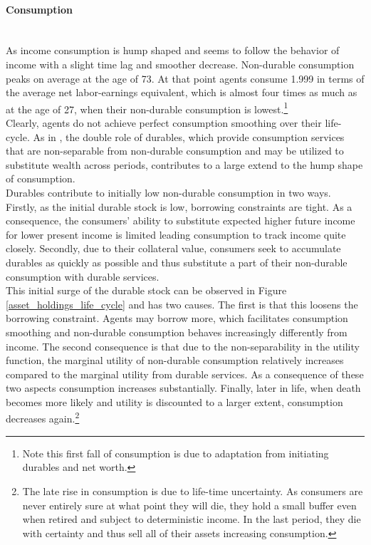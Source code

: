 \documentclass[a4paper,12pt,legno]{article}
\newcommand{\myparagraph}[1]{\paragraph{#1}\mbox{}\\}
\begin{document}
\myparagraph{Consumption} As income consumption is hump shaped and seems to follow the behavior of income with a slight time lag and smoother decrease. Non-durable consumption peaks on average at the age of 73. At that point agents consume 1.999 in terms of the average net labor-earnings equivalent, which is almost four times as much as at the age of 27, when their non-durable consumption is lowest.\footnote{Note this first fall of consumption is due to adaptation from initiating durables and net worth.} \\
Clearly, agents do not achieve perfect consumption smoothing over their life-cycle. As in \cite{FV&K2011}, the double role of durables, which provide consumption services that are non-separable from non-durable consumption and may be utilized to substitute wealth across periods, contributes to a large extend to the hump shape of consumption.\\
Durables contribute to initially low non-durable consumption in two ways. Firstly, as the initial durable stock is low, borrowing constraints are tight. As a consequence, the consumers' ability to substitute expected higher future income for lower present income is limited leading consumption to track income quite closely. Secondly, 
due to their collateral value, consumers seek to accumulate durables as quickly as possible and thus substitute a part of their non-durable consumption with durable services. \\
This initial surge of the durable stock can be observed in Figure \ref{asset_holdings_life_cycle} and has two causes. The first is that this loosens the borrowing constraint. Agents may borrow more, which facilitates consumption smoothing and non-durable consumption behaves increasingly differently from income. The second consequence is that due to the non-separability in the utility function, the marginal utility of non-durable consumption relatively increases compared to the marginal utility from durable services. As a consequence of these two aspects consumption increases substantially. 
Finally, later in life, when death becomes more likely and utility is discounted to a larger extent, consumption decreases again.\footnote{The late rise in consumption is due to life-time uncertainty. As consumers are never entirely sure at what point they will die, they hold a small buffer even when retired and subject to deterministic income. In the last period, they die with certainty and thus sell all of their assets increasing consumption.} 
\end{document}
